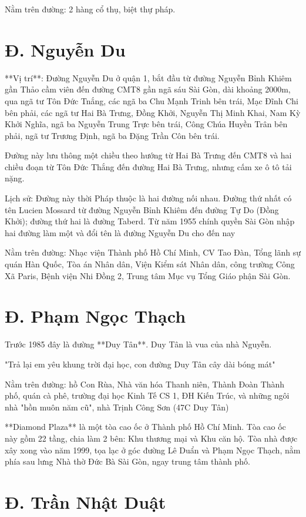  Nằm trên đường: 2 hàng cổ thụ, biệt thự pháp.

\section{Đ. Nguyễn Du}

**Vị trí**: Đường Nguyễn Du ở quận 1, bắt đầu từ đường Nguyễn Bỉnh Khiêm gần Thảo cầm viên đến đường CMT8 gần ngã sáu Sài Gòn, dài khoảng 2000m, qua ngã tư Tôn Đức Tnắng, các ngã ba Chu Mạnh Trinh bên trái, Mạc Đĩnh Chi bên phải, các ngã tư Hai Bà Trưng, Đồng Khởi, Nguyễn Thị Minh Khai, Nam Kỳ Khởi Nghĩa, ngã ba Nguyễn Trung Trực bên trái, Công Chúa Huyền Trân bên phải, ngã tư Trương Định, ngã ba Đặng Trần Côn bên trái.

Đường này lưu thông một chiều theo hướng từ Hai Bà Trưng đến CMT8 và hai chiều đoạn từ Tôn Đức Thắng đến đường Hai Bà Trưng, nhưng cấm xe ô tô tải nặng.

Lịch sử: Đường này thời Pháp thuộc là hai đường nối nhau. Đường thứ nhất có tên Lucien Mossard từ đường Nguyễn Bỉnh Khiêm đến đường Tự Do (Đồng Khởi); đường thứ hai là đường Taberd. Từ năm 1955 chính quyền Sài Gòn nhập hai đường làm một và đổi tên là đường Nguyễn Du cho đến nay

Nằm trên đường: Nhạc viện Thành phố Hồ Chí Minh, CV Tao Đàn, Tổng lãnh sự quán Hàn Quốc, Tòa án Nhân dân, Viện Kiểm sát Nhân dân, công trường Công Xã Paris, Bệnh viện Nhi Đồng 2, Trung tâm Mục vụ Tổng Giáo phận Sài Gòn.

\section{Đ. Phạm Ngọc Thạch}

Trước 1985 đây là đường **Duy Tân**. Duy Tân là vua của nhà Nguyễn.

"Trả lại em yêu khung trời đại học, con đường Duy Tân cây dài bóng mát"

Nằm trên đường: hồ Con Rùa, Nhà văn hóa Thanh niên, Thành Đoàn Thành phố, quán cà phê, trường đại học Kinh Tế CS 1, ĐH Kiến Trúc, và những ngôi nhà "hồn muôn năm cũ", nhà Trịnh Công Sơn (47C Duy Tân)

**Diamond Plaza** là một tòa cao ốc ở Thành phố Hồ Chí Minh. Tòa cao ốc này gồm 22 tầng, chia làm 2 bên: Khu thương mại và Khu căn hộ. Tòa nhà được xây xong vào năm 1999, tọa lạc ở góc đường Lê Duẩn và Phạm Ngọc Thạch, nằm phía sau lưng Nhà thờ Đức Bà Sài Gòn, ngay trung tâm thành phố.

\section{Đ. Trần Nhật Duật}

